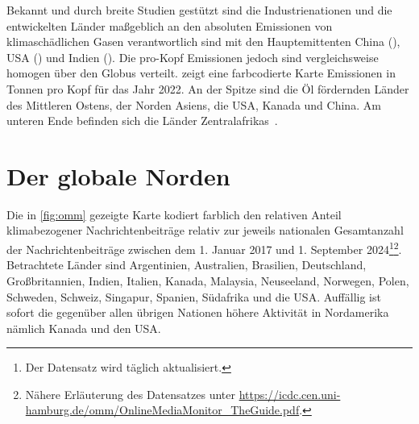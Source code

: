Bekannt und durch breite Studien gestützt sind die Industrienationen und die entwickelten Länder maßgeblich an den absoluten Emissionen von klimaschädlichen Gasen verantwortlich sind mit den Hauptemittenten China (), USA () und Indien ().%
Die pro-Kopf Emissionen jedoch sind vergleichsweise homogen über den Globus verteilt.
 zeigt eine farbcodierte Karte Emissionen in Tonnen pro Kopf für das Jahr 2022.
An der Spitze sind die Öl fördernden Länder des Mittleren Ostens, der Norden Asiens, die USA, Kanada und China.
Am unteren Ende befinden sich die Länder Zentralafrikas~\cite{Misc.DataPagePerCapitaCOEmissions.2023}.

{%
\vspace{\baselineskip}
\centering

\label{fig:ghg per kopf}
\vspace{\baselineskip}
}


\section{Der globale Norden}


\cite{Misc.ReitisMuenstermann.MonitoringClimateChangeAndCOP28InEuropeanOnlineNewsMedia.2024}

Die in \cref{fig:omm} gezeigte Karte kodiert farblich den relativen Anteil klimabezogener Nachrichtenbeiträge relativ zur jeweils nationalen Gesamtanzahl der Nachrichtenbeiträge zwischen dem 1. Januar 2017 und 1. September 2024\footnote{Der Datensatz wird täglich aktualisiert.}\footnote{Nähere Erläuterung des Datensatzes unter \url{https://icdc.cen.uni-hamburg.de/omm/OnlineMediaMonitor_TheGuide.pdf}.}.
Betrachtete Länder sind \glqq Argentinien, Australien, Brasilien, Deutschland, Großbritannien, Indien, Italien, Kanada, Malaysia, Neuseeland, Norwegen, Polen, Schweden, Schweiz, Singapur, Spanien, Südafrika und die USA\grqq.
Auffällig ist sofort die gegenüber allen übrigen Nationen höhere Aktivität in Nordamerika nämlich Kanada und den USA.\par

